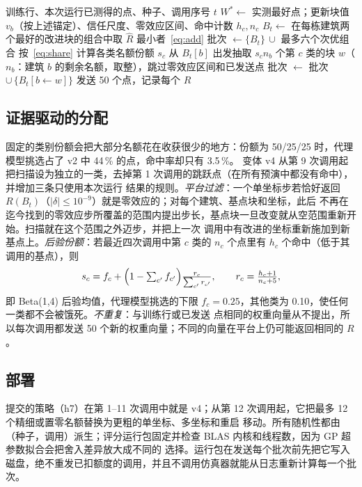 \begin{algorithm}[t]
\caption{策略的一次调用（v4）}
\label{alg:call}
\small
\begin{algorithmic}[1]
\Require 训练行、本次运行已测得的点、种子、调用序号 $t$
\State $W^\ast\gets$ 实测最好点；更新块值 $v_b$（按上述锚定）、信任尺度、零效应区间、命中计数 $h_c,n_c$
\State $B_t\gets$ 在每栋建筑两个最好的改进块的组合中取 $\hat R$ 最小者~\eqref{eq:add}
\State 批次 $\gets\{B_t\}\,\cup$ 最多六个次优组合
\State 按~\eqref{eq:share} 计算各类名额份额 $s_c$
\State 从 $B_t[b]$ 出发抽取 $s_c n_b$ 个第 $c$ 类的块 $w$（$n_b$：建筑 $b$ 的剩余名额，取整），跳过零效应区间和已发送点
\State 批次 $\gets$ 批次 $\cup\,\{B_t[b\!\leftarrow\!w]\}$
\EndFor
\State 发送 50 个点，记录每个 $R$ 
\end{algorithmic}
\end{algorithm}

\subsection{证据驱动的分配}
\label{sec:alloc}
固定的类别份额会把大部分名额花在收获很少的地方：份额为 50/25/25 时，代理模型挑选占了 v2 中 44\,\% 的点，命中率却只有 3.5\,\%。
变体 v4 从第 9 次调用起把扫描设为独立的一类，去掉第 1 次调用的跳跃点（在所有预演中都没有命中），并增加三条只使用本次运行
结果的规则。\emph{平台过滤}：一个单坐标步若恰好返回 $R(B_t)$（$|\delta|\le10^{-9}$）就是零效应的；对每个建筑、基点块和坐标，此后
不再在迄今找到的零效应步所覆盖的范围内提出步长，基点块一旦改变就从空范围重新开始。扫描就在这个范围之外迈步，并把上一次
调用中有改进的坐标重新施加到新基点上。\emph{后验份额}：若最近四次调用中第 $c$ 类的
$n_c$ 个点里有 $h_c$ 个命中（低于其调用的基点），则
\begin{equation}
s_c=f_c+\Bigl(1-\textstyle\sum_{c'}f_{c'}\Bigr)\frac{r_c}{\sum_{c'}r_{c'}},\qquad r_c=\frac{h_c+1}{n_c+5},
\label{eq:share}
\end{equation}
即 Beta(1,4) 后验均值，代理模型挑选的下限 $f_c=0.25$，其他类为 0.10，使任何一类都不会被饿死。\emph{不重复}：与训练行或已发送
点相同的权重向量从不提出，所以每次调用都发送 50 个新的权重向量；不同的向量在平台上仍可能返回相同的 $R$。

\subsection{部署}
\label{sec:deploy}
提交的策略（h7）在第 1--11 次调用中就是 v4；从第 12 次调用起，它把最多 12 个精细或置零名额替换为更粗的单坐标、多坐标和重启
移动。所有随机性都由（种子，调用）派生；评分运行包固定并检查 BLAS 内核和线程数，因为 GP 超参数拟合会把舍入差异放大成不同的
选择。运行包在发送每个批次前先把它写入磁盘，绝不重发已扣额度的调用，并且不调用仿真器就能从日志重新计算每一个批次。
